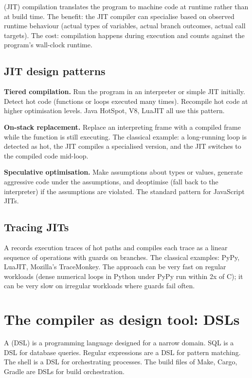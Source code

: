 (JIT) compilation translates the program to machine code at runtime rather than at build time. The benefit: the JIT compiler can specialise based on observed runtime behaviour (actual types of variables, actual branch outcomes, actual call targets). The cost: compilation happens during execution and counts against the program's wall-clock runtime.

\subsection{JIT design patterns}

\textbf{Tiered compilation.} Run the program in an interpreter or simple JIT initially. Detect hot code (functions or loops executed many times). Recompile hot code at higher optimisation levels. Java HotSpot, V8, LuaJIT all use this pattern.

\textbf{On-stack replacement.} Replace an interpreting frame with a compiled frame while the function is still executing. The classical example: a long-running loop is detected as hot, the JIT compiles a specialised version, and the JIT switches to the compiled code mid-loop.

\textbf{Speculative optimisation.} Make assumptions about types or values, generate aggressive code under the assumptions, and deoptimise (fall back to the interpreter) if the assumptions are violated. The standard pattern for JavaScript JITs.

\subsection{Tracing JITs}

A  records execution traces of hot paths and compiles each trace as a linear sequence of operations with guards on branches. The classical examples: PyPy, LuaJIT, Mozilla's TraceMonkey. The approach can be very fast on regular workloads (dense numerical loops in Python under PyPy run within 2x of C); it can be very slow on irregular workloads where guards fail often.

\section{The compiler as design tool: DSLs}

A  (DSL) is a programming language designed for a narrow domain. SQL is a DSL for database queries. Regular expressions are a DSL for pattern matching. The shell is a DSL for orchestrating processes. The build files of Make, Cargo, Gradle are DSLs for build orchestration.

